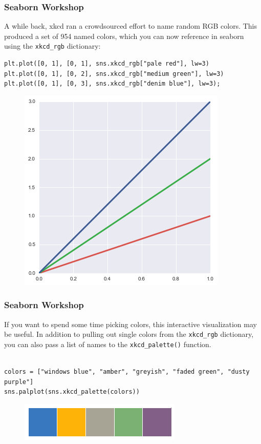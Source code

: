 \documentclass{beamer}
\begin{document}
\begin{frame}[fragile]
	\frametitle{Seaborn Workshop}
	\large
A while back, xkcd ran a crowdsourced effort to name random RGB colors. This produced a set of 954 named colors, which you can now reference in seaborn using the \texttt{xkcd\_rgb} dictionary:
\begin{verbatim}
plt.plot([0, 1], [0, 1], sns.xkcd_rgb["pale red"], lw=3)
plt.plot([0, 1], [0, 2], sns.xkcd_rgb["medium green"], lw=3)
plt.plot([0, 1], [0, 3], sns.xkcd_rgb["denim blue"], lw=3);
\end{verbatim}

\begin{figure}
\centering
\includegraphics[width=0.7\linewidth]{images/color_palettes_21_0}
\caption{}
\label{fig:color_palettes_21_0}
\end{figure}
\end{frame}
\begin{frame}[fragile]
	\frametitle{Seaborn Workshop}
	\large
If you want to spend some time picking colors, this interactive visualization may be useful. In addition to pulling out single colors from the \texttt{xkcd\_rgb} dictionary, you can also pass a list of names to the \texttt{xkcd\_palette()} function.
\begin{verbatim}

colors = ["windows blue", "amber", "greyish", "faded green", "dusty purple"]
sns.palplot(sns.xkcd_palette(colors))
\end{verbatim}

\begin{figure}
\centering
\includegraphics[width=0.7\linewidth]{images/color_palettes_23_0}
\caption{}
\label{fig:color_palettes_23_0}
\end{figure}

\end{frame}
\end{document}
